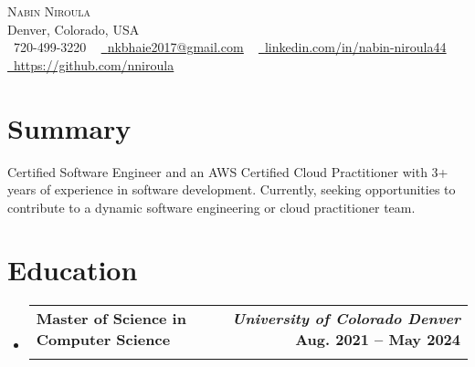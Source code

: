\documentclass[letterpaper,11pt]{article}
\makeatletter
\newcommand{\resumeSubheading}[4]{
  \vspace{-2pt}\item
    \begin{tabular*}{1.0\textwidth}[t]{l@{\extracolsep{\fill}}r}
      \textbf{#1} & \textbf{\small #2} \\
      \textit{\small#3} & \textit{\small #4} \\
    \end{tabular*}\vspace{-7pt}
}
\newcommand{\resumeSubHeadingListStart}{\begin{itemize}[leftmargin=0.0in, label={}]}
\newcommand{\resumeSubHeadingListEnd}{\end{itemize}}
\makeatother
\begin{document}

\begin{center}
    {\Huge \scshape Nabin Niroula} \\ \vspace{1pt}
    Denver, Colorado, USA \\ \vspace{1pt}
    \small \raisebox{-0.1\height}\faPhone\ 720-499-3220 ~ \href{mailto:x@gmail.com}{\raisebox{-0.2\height}\faEnvelope\  \underline{nkbhaie2017@gmail.com}} ~ 
    \href{https://linkedin.com/in//}{\raisebox{-0.2\height}\faLinkedin\ \underline{linkedin.com/in/nabin-niroula44}}  ~
    \href{https://github.com/}{\raisebox{-0.2\height}\faGithub\ \underline{https://github.com/nniroula}}
    \vspace{-8pt}
\end{center}

\section{Summary}
 \begin{itemize}[leftmargin=0.15in, label={}]
     \small{\item{
     {Certified Software Engineer and an AWS Certified Cloud Practitioner with 3+ years of experience in software development. Currently, seeking opportunities to contribute to a dynamic  software engineering or cloud practitioner team.}
     }}
    
 \end{itemize}
 \vspace{-16pt}

\section{Education}
  \resumeSubHeadingListStart
    \resumeSubheading
      {Master of Science in Computer Science} {\textit{\textmd{University of Colorado Denver}} \quad \quad  \quad Aug. 2021 -- May 2024}
      {}{}
    \vspace*{-16pt}
  \resumeSubHeadingListEnd
\end{document}
